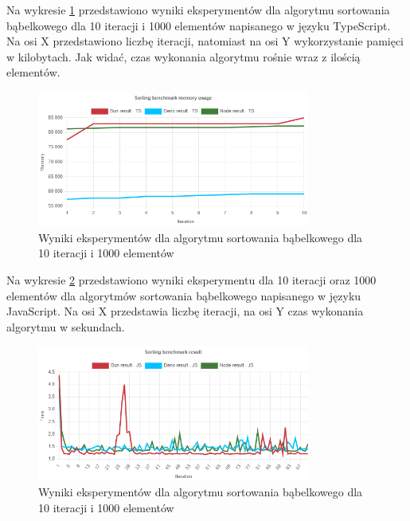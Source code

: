 Na wykresie \ref{fig:bubble_sorting_e1_memory_ts} przedstawiono wyniki eksperymentów dla algorytmu sortowania bąbelkowego dla 10 iteracji i 1000 elementów napisanego w języku TypeScript. Na osi X przedstawiono liczbę iteracji, natomiast na osi Y wykorzystanie pamięci w kilobytach. Jak widać, czas wykonania algorytmu rośnie wraz z ilością elementów.
\begin{figure}[H]
  \centering
  \includegraphics[width=0.8\textwidth]{Figures/sorting/bubble/e1_memory_ts.png}
  \caption{Wyniki eksperymentów dla algorytmu sortowania bąbelkowego dla 10 iteracji i 1000 elementów}
  \label{fig:bubble_sorting_e1_memory_ts}
\end{figure}

Na wykresie \ref{fig:bubble_sorting_e2} przedstawiono wyniki eksperymentu dla 10 iteracji oraz 1000 elementów dla algorytmów sortowania bąbelkowego napisanego w języku JavaScript. Na osi X przedstawia liczbę iteracji, na osi Y czas wykonania algorytmu w sekundach. 

\begin{figure}[H]
  \centering
  \includegraphics[width=0.8\textwidth]{Figures/sorting/bubble/e2_js.png}
  \caption{Wyniki eksperymentów dla algorytmu sortowania bąbelkowego dla 10 iteracji i 1000 elementów}
  \label{fig:bubble_sorting_e2}
\end{figure}

